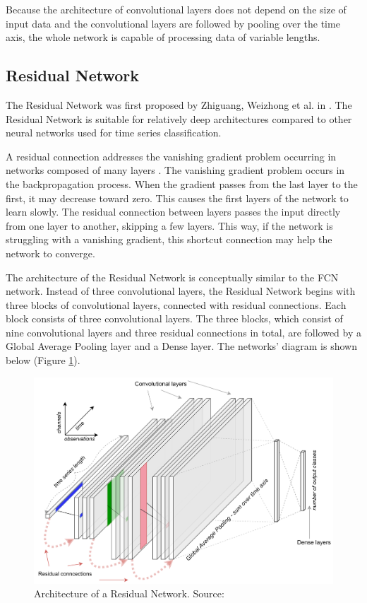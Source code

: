 \documentclass[a4paper,11pt,twoside]{report}
\theoremstyle{definition}
\begin{document}
\FloatBarrier

Because the architecture of convolutional layers does not depend on the size of input data and the convolutional layers are followed by pooling over the time axis, the whole network is capable of processing data of variable lengths.
\subsection{Residual Network}
The Residual Network was first proposed by Zhiguang, Weizhong et al. in \cite{residual}. The Residual Network is suitable for relatively deep architectures compared to other neural networks used for time series classification.

A residual connection addresses the vanishing gradient problem occurring in networks composed of many layers \cite{residual}. The vanishing gradient problem occurs in the backpropagation process. When the gradient passes from the last layer to the first, it may decrease toward zero. This causes the first layers of the network to learn slowly. The residual connection between layers passes the input directly from one layer to another, skipping a few layers. This way, if the network is struggling with a vanishing gradient, this shortcut connection may help the network to converge.

The architecture of the Residual Network is conceptually similar to the FCN network. Instead of three convolutional layers, the Residual Network begins with three blocks of convolutional layers, connected with residual connections. Each block consists of three convolutional layers. The three blocks, which consist of nine convolutional layers and three residual connections in total, are followed by a Global Average Pooling layer and a Dense layer. The networks' diagram is shown below (Figure \ref{fig:Resnet_img}).


\FloatBarrier

\begin{figure}[h!]
\centering
\includegraphics[width=15.5cm]{imgs/resnet.png}
\caption{Architecture of a Residual Network. Source: \cite{dl_tsc}}
\label{fig:Resnet_img}
\end{figure}
\end{document}
